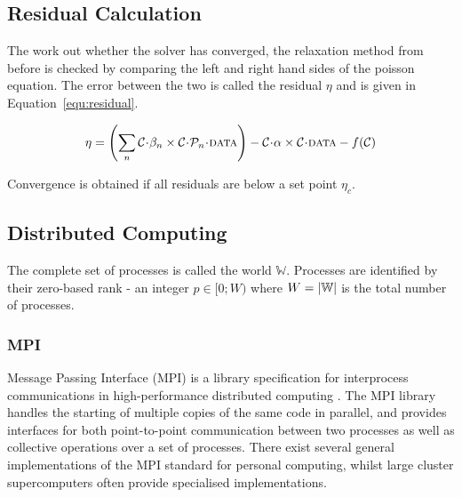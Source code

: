 \documentclass[twoside]{IIBproject}
\newcommand{\acc}{{\mkern 0.5mu\cdot\mkern 0.5mu}}
\numberwithin{figure}{section}
\begin{document}


    \subsection{Residual Calculation} %
        \label{sec:residual}

        The work out whether the solver has converged, the relaxation method from before is checked by comparing the left and right hand sides of the poisson equation. The error between the two is called the residual $\eta$ and is given in Equation~\ref{equ:residual}.

        \begin{equation}
            \eta = \left( \sum\limits_n \mathcal{C}\acc\beta_n \times \mathcal{C}\acc\mathcal{P}_n\acc\textproc{data} \right)
             - \mathcal{C}\acc\alpha \times \mathcal{C}\acc\textproc{data}
             -f(\mathcal{C}) 
             \label{equ:residual}
        \end{equation}

        Convergence is obtained if all residuals are below a set point $\eta_c$. 



    \subsection{Distributed Computing} %
        \label{sec:computing}

        The complete set of processes is called the world $\mathbb{W}$. Processes are identified by their zero-based rank - an integer $p \in [0;W)$ where $W=\abs{\mathbb{W}}$ is the total number of processes. 

        \subsubsection{MPI} %
            \label{sec:mpi}

            Message Passing Interface (MPI) is a library specification for interprocess communications in high-performance distributed computing \cite{mpi94}. The MPI library handles the starting of multiple copies of the same code in parallel, and provides interfaces for both point-to-point communication between two processes as well as collective operations over a set of processes. There exist several general implementations of the MPI standard for personal computing, whilst large cluster supercomputers often provide specialised implementations.
\end{document}
